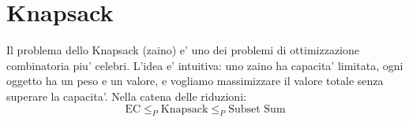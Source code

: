 \section{Knapsack}

Il problema dello Knapsack (zaino) e' uno dei problemi di ottimizzazione combinatoria piu' celebri. L'idea e' intuitiva: uno zaino ha capacita' limitata, ogni oggetto ha un peso e un valore, e vogliamo massimizzare il valore totale senza superare la capacita'. Nella catena delle riduzioni:
\[
  \text{EC} \leq_P \text{Knapsack} \leq_P \text{Subset Sum}
\]


